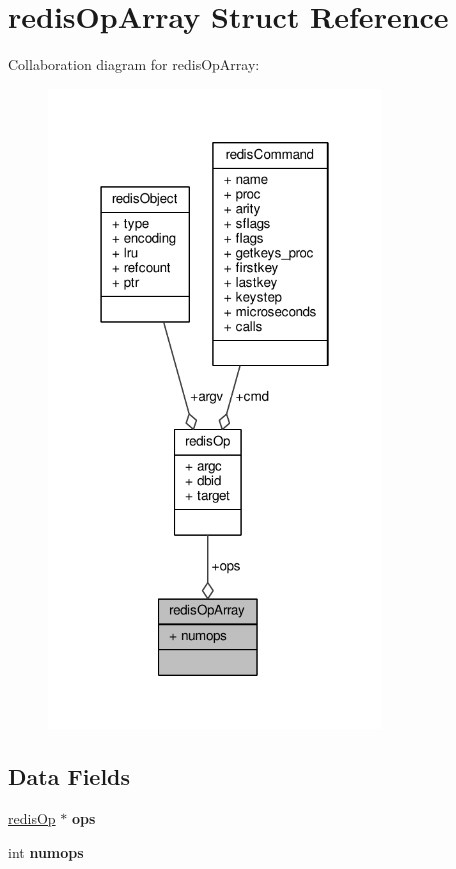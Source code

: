 \hypertarget{structredisOpArray}{}\section{redis\+Op\+Array Struct Reference}
\label{structredisOpArray}


Collaboration diagram for redis\+Op\+Array\+:\nopagebreak
\begin{figure}[H]
\begin{center}
\leavevmode
\includegraphics[width=250pt]{structredisOpArray__coll__graph}
\end{center}
\end{figure}
\subsection*{Data Fields}
\begin{DoxyCompactItemize}
\item 
\mbox{\label{structredisOpArray_a4f2c81d59e63c79fb4fbd515c431b0eb}} 
\hyperlink{structredisOp}{redis\+Op} $\ast$ {\bfseries ops}
\item 
\mbox{\label{structredisOpArray_a1f91aad851c4773626ddb0265e5b0290}} 
int {\bfseries numops}
\end{DoxyCompactItemize}


